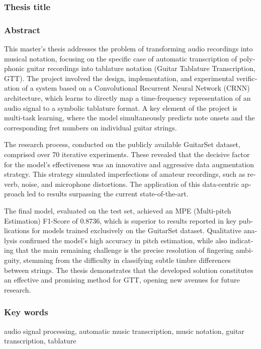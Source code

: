 \clearpage

\subsubsection*{Thesis title}
\begin{otherlanguage}{british}
\TitleAlt
\end{otherlanguage}

\subsubsection*{Abstract}
\begin{otherlanguage}{british}
This master's thesis addresses the problem of transforming audio recordings into musical notation, focusing on the specific case of automatic transcription of polyphonic guitar recordings into tablature notation (Guitar Tablature Transcription, GTT). The project involved the design, implementation, and experimental verification of a system based on a Convolutional Recurrent Neural Network (CRNN) architecture, which learns to directly map a time-frequency representation of an audio signal to a symbolic tablature format. A key element of the project is multi-task learning, where the model simultaneously predicts note onsets and the corresponding fret numbers on individual guitar strings.

The research process, conducted on the publicly available GuitarSet dataset, comprised over 70 iterative experiments. These revealed that the decisive factor for the model's effectiveness was an innovative and aggressive data augmentation strategy. This strategy simulated imperfections of amateur recordings, such as reverb, noise, and microphone distortions. The application of this data-centric approach led to results surpassing the current state-of-the-art.

The final model, evaluated on the test set, achieved an MPE (Multi-pitch Estimation) F1-Score of 0.8736, which is superior to results reported in key publications for models trained exclusively on the GuitarSet dataset. Qualitative analysis confirmed the model's high accuracy in pitch estimation, while also indicating that the main remaining challenge is the precise resolution of fingering ambiguity, stemming from the difficulty in classifying subtle timbre differences between strings. The thesis demonstrates that the developed solution constitutes an effective and promising method for GTT, opening new avenues for future research.
\end{otherlanguage}

\subsubsection*{Key words}
\begin{otherlanguage}{british}
audio signal processing, automatic music transcription, music notation, guitar transcription, tablature
\end{otherlanguage}